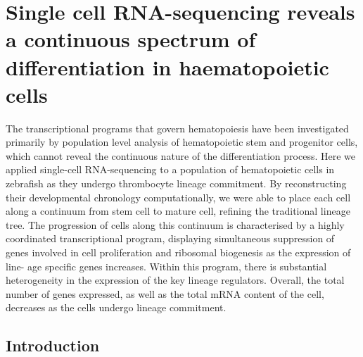 
\chapter{Single cell RNA-sequencing reveals a continuous spectrum of differentiation in haematopoietic cells}

\graphicspath{{Chapter3/Figs/}}

The transcriptional programs that govern hematopoiesis have been investigated primarily by population level analysis of hematopoietic stem and progenitor cells, which cannot reveal the continuous nature of the differentiation process. Here we applied single-cell RNA-sequencing to a population of hematopoietic cells in zebrafish as they undergo thrombocyte lineage commitment. By reconstructing their developmental chronology computationally, we were able to place each cell along a continuum from stem cell to mature cell, refining the traditional lineage tree. The progression of cells along this continuum is characterised by a highly coordinated transcriptional program, displaying simultaneous suppression of genes involved in cell proliferation and ribosomal biogenesis as the expression of line- age specific genes increases. Within this program, there is substantial heterogeneity in the expression of the key lineage regulators. Overall, the total number of genes expressed, as well as the total mRNA content of the cell, decreases as the cells undergo lineage commitment.

\section{Introduction}

